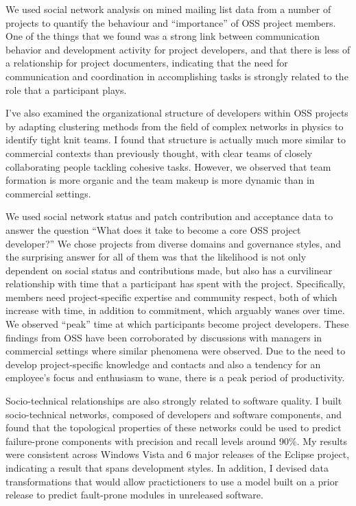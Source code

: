 \documentclass[10pt]{article}
\begin{document}
\begin{small}
We used social network analysis on mined mailing list data from a number of
projects to quantify the behaviour and ``importance'' of OSS project members.
One of the things that we found was a strong link between communication
behavior and development activity for project developers, and that there is
less of a relationship for project documenters, indicating that the need for
communication and coordination in accomplishing tasks is strongly related to
the role that a participant plays.

I've also examined the organizational structure of developers within OSS
projects by adapting clustering methods from the field of complex networks in
physics to identify tight knit teams.  I found that structure is actually much
more similar to commercial contexts than previously thought, with clear teams
of closely collaborating people tackling cohesive tasks. However, we observed
that team formation is more organic and the team makeup is more dynamic than in
commercial settings.

We used social network status and patch contribution and acceptance data to
answer the question ``What does it take to become a core OSS project
developer?'' We chose projects from diverse domains and governance styles, and
the surprising answer for all of them was that the likelihood is not only
dependent on social status and contributions made, but also has a curvilinear
relationship with time that a participant has spent with the project.
Specifically, members need project-specific expertise and community respect,
both of which increase with time, in addition to commitment, which arguably
wanes over time.  We observed ``peak'' time at which participants become
project developers.  These findings from OSS have been corroborated by
discussions with managers in commercial settings where similar phenomena were
observed.  Due to the need to develop project-specific knowledge and contacts
and also a tendency for an employee's focus and enthusiasm to wane, there is a
peak period of productivity.

Socio-technical relationships are also strongly related to software quality.  I
built socio-technical networks, composed of developers and software components,
and found that the topological properties of these networks could be used to
predict failure-prone components with precision and recall levels around 90\%.
My results were consistent across Windows Vista and 6 major releases of the
Eclipse project, indicating a result that spans development styles.  In
addition, I devised data transformations that would allow practictioners to use
a model built on a prior release to predict fault-prone modules in unreleased
software.


\end{small}
\end{document}
